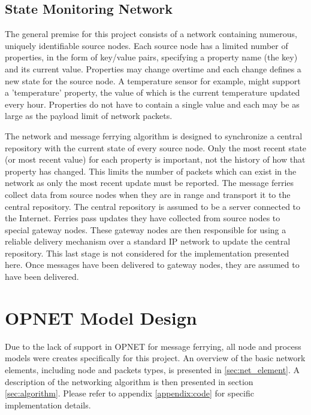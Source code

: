 \subsection{State Monitoring Network}

The general premise for this project consists of a network containing numerous, uniquely identifiable source nodes. 
Each source node has a limited number of properties, in the form of key/value pairs, specifying a property name (the key) and its current value.
Properties may change overtime and each change defines a new state for the source node.
A temperature sensor for example, might support a 'temperature' property, the value of which is the current temperature updated every hour.
Properties do not have to contain a single value and each may be as large as the payload limit of network packets. %

The network and message ferrying algorithm is designed to synchronize a central repository with the current state of every source node.
Only the most recent state (or most recent value) for each property is important, not the history of how that property has changed.
This limits the number of packets which can exist in the network as only the most recent update must be reported.
The message ferries collect data from source nodes when they are in range and transport it to the central repository.
The central repository is assumed to be a server connected to the Internet.
Ferries pass updates they have collected from source nodes to special gateway nodes.
These gateway nodes are then responsible for using a reliable delivery mechanism over a standard IP network to update the central repository.
This last stage is not considered for the implementation presented here.
Once messages have been delivered to gateway nodes, they are assumed to have been delivered.

\section{OPNET Model Design}
\label{sec:model_design}

Due to the lack of support in OPNET for message ferrying, all node and process models were creates specifically for this project. 
An overview of the basic network elements, including node and packets types, is presented in \ref{sec:net_element}.
A description of the networking algorithm is then presented in section \ref{sec:algorithm}.
Please refer to appendix \ref{appendix:code} for specific implementation details.

